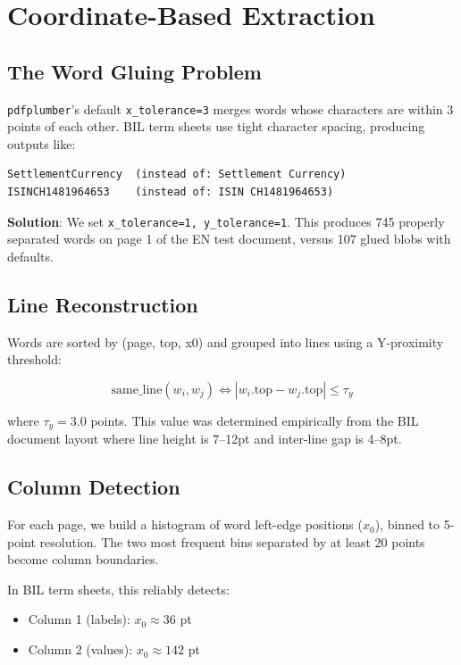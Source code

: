\documentclass[11pt,a4paper]{article}
\begin{document}
\section{Coordinate-Based Extraction}

\subsection{The Word Gluing Problem}

\texttt{pdfplumber}'s default \texttt{x\_tolerance=3} merges words whose
characters are within 3 points of each other. BIL term sheets use tight
character spacing, producing outputs like:

\begin{lstlisting}
SettlementCurrency  (instead of: Settlement Currency)
ISINCH1481964653    (instead of: ISIN CH1481964653)
\end{lstlisting}

\textbf{Solution}: We set \texttt{x\_tolerance=1, y\_tolerance=1}. This
produces 745 properly separated words on page 1 of the EN test document,
versus 107 glued blobs with defaults.

\subsection{Line Reconstruction}

Words are sorted by (page, top, x0) and grouped into lines using a
Y-proximity threshold:

$$
\text{same\_line}(w_i, w_j) \iff |w_i.\text{top} - w_j.\text{top}| \leq \tau_y
$$

where $\tau_y = 3.0$ points. This value was determined empirically from the
BIL document layout where line height is 7--12pt and inter-line gap is 4--8pt.

\subsection{Column Detection}

For each page, we build a histogram of word left-edge positions ($x_0$),
binned to 5-point resolution. The two most frequent bins separated by at
least 20 points become column boundaries.

In BIL term sheets, this reliably detects:
\begin{itemize}
  \item Column 1 (labels): $x_0 \approx 36$ pt
  \item Column 2 (values): $x_0 \approx 142$ pt
\end{itemize}
\end{document}
